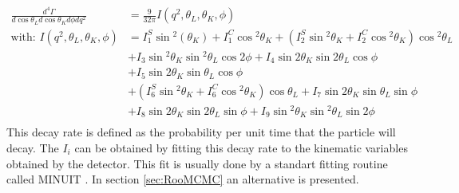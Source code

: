 \documentclass[english]{uzhpub}
\begin{document}
 \begin{equation}
  \begin{split}
   \frac{d^4 \Gamma}{d \cos{ \theta_L} d \cos{\theta_K} d \phi d q^2} &= \frac{9}{32 \pi} I(q^2,\theta_L, \theta_K, \phi) \\
   \text{with: } I(q^2,\theta_L, \theta_K, \phi) &= I_1^S \sin{^2(\theta_K)} + I_1^C \cos{^2 \theta_K} + \left(I_2^S \sin{^2 \theta_K} + I_2^C \cos{^2 \theta_K} \right) \cos{^2\theta_L} \\
   &+ I_3 \sin{^2 \theta_K} \sin{^2 \theta_L} \cos{2\phi} + I_4 \sin{2\theta_K} \sin{2\theta_L} \cos{\phi} \\
   &+ I_5 \sin{2\theta_K} \sin{ \theta_L} \cos{ \phi} \\
   &+ \left(I_6^S \sin{^2 \theta_K} + I_6^C \cos{^2 \theta_K}  \right) \cos{ \theta_L} + I_7 \sin{ 2\theta_K} \sin{\theta_L} \sin{\phi} \\
   &+ I_8 \sin{ 2\theta_K} \sin{ 2\theta_L} \sin{ \phi} + I_9 \sin{^2 \theta_K} \sin{^2 \theta_L} \sin{2 \phi}\\
  \end{split}
  \label{eq:diff_decay_rate}
 \end{equation}
 This decay rate is defined as the probability per unit time that the particle will decay. The $I_i$ can be obtained by fitting this decay rate to the kinematic variables obtained by the detector. This fit is usually done by a standart fitting routine called MINUIT \cite{bib:Minuit}. In section \ref{sec:RooMCMC} an alternative is presented.
\end{document}
